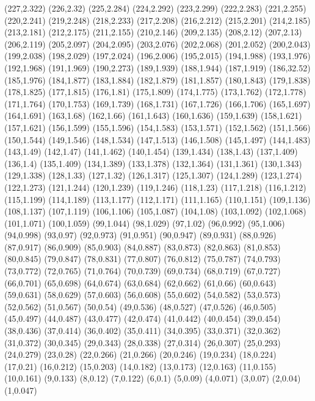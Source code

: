 (227,2.322)
(226,2.32)
(225,2.284)
(224,2.292)
(223,2.299)
(222,2.283)
(221,2.255)
(220,2.241)
(219,2.248)
(218,2.233)
(217,2.208)
(216,2.212)
(215,2.201)
(214,2.185)
(213,2.181)
(212,2.175)
(211,2.155)
(210,2.146)
(209,2.135)
(208,2.12)
(207,2.13)
(206,2.119)
(205,2.097)
(204,2.095)
(203,2.076)
(202,2.068)
(201,2.052)
(200,2.043)
(199,2.038)
(198,2.029)
(197,2.024)
(196,2.006)
(195,2.015)
(194,1.988)
(193,1.976)
(192,1.968)
(191,1.969)
(190,2.273)
(189,1.939)
(188,1.944)
(187,1.919)
(186,32.52)
(185,1.976)
(184,1.877)
(183,1.884)
(182,1.879)
(181,1.857)
(180,1.843)
(179,1.838)
(178,1.825)
(177,1.815)
(176,1.81)
(175,1.809)
(174,1.775)
(173,1.762)
(172,1.778)
(171,1.764)
(170,1.753)
(169,1.739)
(168,1.731)
(167,1.726)
(166,1.706)
(165,1.697)
(164,1.691)
(163,1.68)
(162,1.66)
(161,1.643)
(160,1.636)
(159,1.639)
(158,1.621)
(157,1.621)
(156,1.599)
(155,1.596)
(154,1.583)
(153,1.571)
(152,1.562)
(151,1.566)
(150,1.544)
(149,1.546)
(148,1.534)
(147,1.513)
(146,1.508)
(145,1.497)
(144,1.483)
(143,1.49)
(142,1.47)
(141,1.462)
(140,1.454)
(139,1.434)
(138,1.43)
(137,1.409)
(136,1.4)
(135,1.409)
(134,1.389)
(133,1.378)
(132,1.364)
(131,1.361)
(130,1.343)
(129,1.338)
(128,1.33)
(127,1.32)
(126,1.317)
(125,1.307)
(124,1.289)
(123,1.274)
(122,1.273)
(121,1.244)
(120,1.239)
(119,1.246)
(118,1.23)
(117,1.218)
(116,1.212)
(115,1.199)
(114,1.189)
(113,1.177)
(112,1.171)
(111,1.165)
(110,1.151)
(109,1.136)
(108,1.137)
(107,1.119)
(106,1.106)
(105,1.087)
(104,1.08)
(103,1.092)
(102,1.068)
(101,1.071)
(100,1.059)
(99,1.044)
(98,1.029)
(97,1.02)
(96,0.992)
(95,1.006)
(94,0.998)
(93,0.97)
(92,0.973)
(91,0.951)
(90,0.947)
(89,0.931)
(88,0.926)
(87,0.917)
(86,0.909)
(85,0.903)
(84,0.887)
(83,0.873)
(82,0.863)
(81,0.853)
(80,0.845)
(79,0.847)
(78,0.831)
(77,0.807)
(76,0.812)
(75,0.787)
(74,0.793)
(73,0.772)
(72,0.765)
(71,0.764)
(70,0.739)
(69,0.734)
(68,0.719)
(67,0.727)
(66,0.701)
(65,0.698)
(64,0.674)
(63,0.684)
(62,0.662)
(61,0.66)
(60,0.643)
(59,0.631)
(58,0.629)
(57,0.603)
(56,0.608)
(55,0.602)
(54,0.582)
(53,0.573)
(52,0.562)
(51,0.567)
(50,0.54)
(49,0.536)
(48,0.527)
(47,0.526)
(46,0.505)
(45,0.497)
(44,0.487)
(43,0.477)
(42,0.474)
(41,0.442)
(40,0.454)
(39,0.454)
(38,0.436)
(37,0.414)
(36,0.402)
(35,0.411)
(34,0.395)
(33,0.371)
(32,0.362)
(31,0.372)
(30,0.345)
(29,0.343)
(28,0.338)
(27,0.314)
(26,0.307)
(25,0.293)
(24,0.279)
(23,0.28)
(22,0.266)
(21,0.266)
(20,0.246)
(19,0.234)
(18,0.224)
(17,0.21)
(16,0.212)
(15,0.203)
(14,0.182)
(13,0.173)
(12,0.163)
(11,0.155)
(10,0.161)
(9,0.133)
(8,0.12)
(7,0.122)
(6,0.1)
(5,0.09)
(4,0.071)
(3,0.07)
(2,0.04)
(1,0.047)
